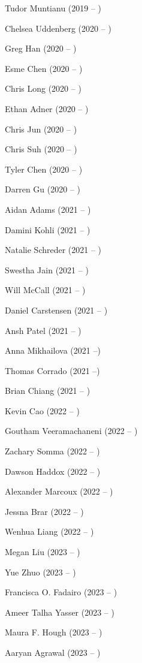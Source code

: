 \documentclass{tufte-book} %
\begin{document}
\begin{fullwidth}
\begin{multicols}{2}\raggedcolumns
\begin{list}{\quad}{}
\item Tudor Muntianu (2019 -- )
\item Chelsea Uddenberg (2020 -- )
\item Greg Han (2020 -- )
\item Esme Chen (2020 -- )
\item Chris Long (2020 -- )
\item Ethan Adner (2020 -- )
\item Chris Jun (2020 -- )
\item Chris Suh (2020 -- )
\item Tyler Chen (2020 -- )
\item Darren Gu (2020 -- )
\item Aidan Adams (2021 -- )
\item Damini Kohli (2021 -- )
\item Natalie Schreder (2021 -- )
\item Swestha Jain (2021 -- )
\item Will McCall (2021 -- )
\item Daniel Carstensen (2021 -- )
\item Ansh Patel (2021 -- )
\item Anna Mikhailova (2021 --)
\item Thomas Corrado (2021 --)
\item Brian Chiang (2021 -- )
\item Kevin Cao (2022 -- )
\item Goutham Veeramachaneni (2022 -- )
\item Zachary Somma (2022 -- )
\item Dawson Haddox (2022 -- )
\item Alexander Marcoux (2022 -- )
\item Jessna Brar (2022 -- )
\item Wenhua Liang (2022 -- )
\item Megan Liu (2023 -- )
\item Yue Zhuo (2023 -- )
\item Francisca O. Fadairo (2023 -- )
\item Ameer Talha Yasser (2023 -- )
\item Maura F. Hough (2023 -- )
\item Aaryan Agrawal (2023 -- )

\end{list}
\end{multicols}


\end{fullwidth}
\end{document}

